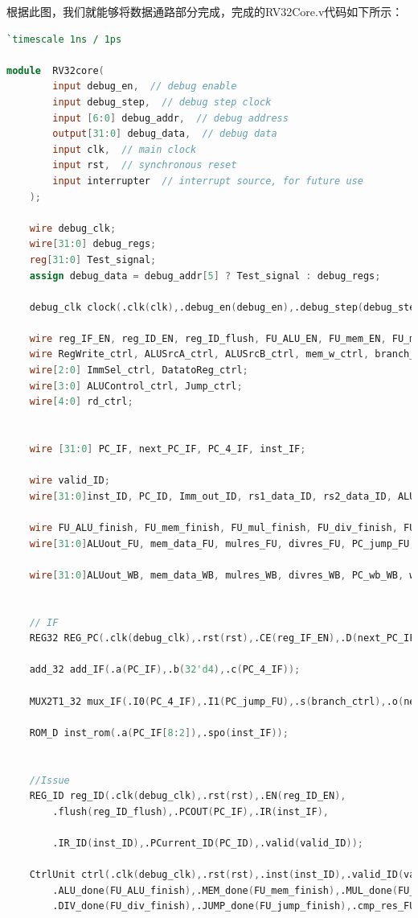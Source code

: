 根据此图，我们就能够将数据通路部分完成，完成的RV32Core.v代码如下所示：
\begin{lstlisting}[language = {verilog}]
`timescale 1ns / 1ps

module  RV32core(
		input debug_en,  // debug enable
		input debug_step,  // debug step clock
		input [6:0] debug_addr,  // debug address
		output[31:0] debug_data,  // debug data
		input clk,  // main clock
		input rst,  // synchronous reset
		input interrupter  // interrupt source, for future use
	);

	wire debug_clk;
	wire[31:0] debug_regs;
	reg[31:0] Test_signal;
	assign debug_data = debug_addr[5] ? Test_signal : debug_regs;

	debug_clk clock(.clk(clk),.debug_en(debug_en),.debug_step(debug_step),.debug_clk(debug_clk));

	wire reg_IF_EN, reg_ID_EN, reg_ID_flush, FU_ALU_EN, FU_mem_EN, FU_mul_EN, FU_div_EN, FU_jump_EN;
	wire RegWrite_ctrl, ALUSrcA_ctrl, ALUSrcB_ctrl, mem_w_ctrl, branch_ctrl;
	wire[2:0] ImmSel_ctrl, DatatoReg_ctrl;
	wire[3:0] ALUControl_ctrl, Jump_ctrl;
	wire[4:0] rd_ctrl;


	wire [31:0] PC_IF, next_PC_IF, PC_4_IF, inst_IF;

	wire valid_ID;
	wire[31:0]inst_ID, PC_ID, Imm_out_ID, rs1_data_ID, rs2_data_ID, ALUA_ID, ALUB_ID;

	wire FU_ALU_finish, FU_mem_finish, FU_mul_finish, FU_div_finish, FU_jump_finish, cmp_res_FU;
	wire[31:0]ALUout_FU, mem_data_FU, mulres_FU, divres_FU, PC_jump_FU, PC_wb_FU;

	wire[31:0]ALUout_WB, mem_data_WB, mulres_WB, divres_WB, PC_wb_WB, wt_data_WB;


	// IF
	REG32 REG_PC(.clk(debug_clk),.rst(rst),.CE(reg_IF_EN),.D(next_PC_IF),.Q(PC_IF));
	
	add_32 add_IF(.a(PC_IF),.b(32'd4),.c(PC_4_IF));

	MUX2T1_32 mux_IF(.I0(PC_4_IF),.I1(PC_jump_FU),.s(branch_ctrl),.o(next_PC_IF));

	ROM_D inst_rom(.a(PC_IF[8:2]),.spo(inst_IF));


	//Issue
	REG_ID reg_ID(.clk(debug_clk),.rst(rst),.EN(reg_ID_EN),
		.flush(reg_ID_flush),.PCOUT(PC_IF),.IR(inst_IF),

		.IR_ID(inst_ID),.PCurrent_ID(PC_ID),.valid(valid_ID));
	
	CtrlUnit ctrl(.clk(debug_clk),.rst(rst),.inst(inst_ID),.valid_ID(valid_ID),
		.ALU_done(FU_ALU_finish),.MEM_done(FU_mem_finish),.MUL_done(FU_mul_finish),
		.DIV_done(FU_div_finish),.JUMP_done(FU_jump_finish),.cmp_res_FU(cmp_res_FU),


\end{lstlisting}
